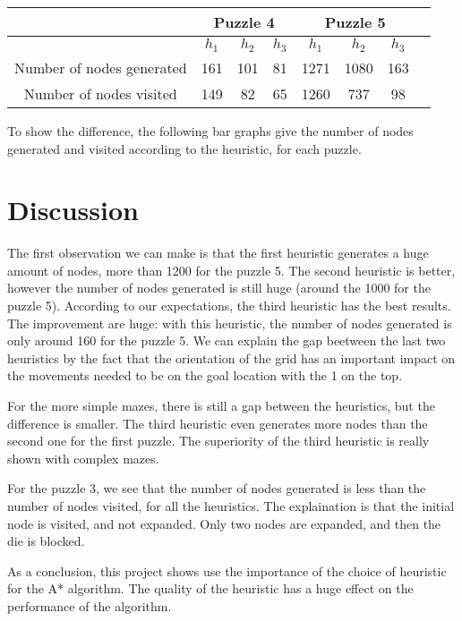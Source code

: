 \documentclass[]{article}
\begin{document}
\begin{center}
    \begin{tabular}{| c | c | c | c | c | c | c | c |}
      \cline{2-7} & \multicolumn{3}{|c|}{Puzzle 4} & \multicolumn{3}{|c|}{Puzzle 5} \\
      \hline
    & $h_1$ & $h_2$ & $h_3$ & $h_1$ & $h_2$& $h_3$ \\ \hline
    Number of nodes generated & 161 & 101 & 81 & 1271 & 1080 & 163  \\ \hline
    Number of nodes visited   & 149 & 82  & 65 & 1260 &  737 &  98 \\ \hline
    \end{tabular}
\end{center}

To show the difference, the following bar graphs give the number of nodes generated and visited according to the heuristic, for each puzzle.











\section{Discussion}

The first observation we can make is that the first heuristic generates a huge amount of nodes, more than 1200 for the puzzle 5.
The second heuristic is better, however the number of nodes generated is still huge (around the 1000 for the puzzle 5).
According to our expectations, the third heuristic has the best results.
The improvement are huge: with this heuristic, the number of nodes generated is only around 160 for the puzzle 5.
We can explain the gap beetween the last two heuristics by the fact that the orientation of the grid has an important impact on the movements needed to be on the goal location with the 1 on the top.

For the more simple mazes, there is still a gap between the heuristics, but the difference is smaller.
The third heuristic even generates more nodes than the second one for the first puzzle.
The superiority of the third heuristic is really shown with complex mazes.

For the puzzle 3, we see that the number of nodes generated is less than the number of nodes visited, for all the heuristics.
The explaination is that the initial node is visited, and not expanded. Only two nodes are expanded, and then the die is blocked.

As a conclusion, this project shows use the importance of the choice of heuristic for the A* algorithm.
The quality of the heuristic has a huge effect on the performance of the algorithm.
\end{document}
